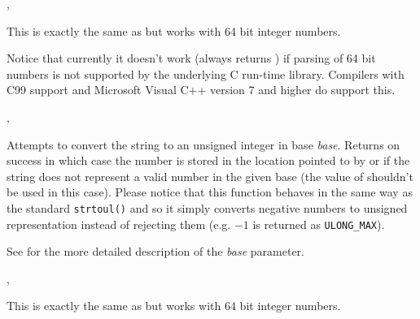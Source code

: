 
,\\


\label{wxstringtolonglong}


This is exactly the same as  but works with 64
bit integer numbers.

Notice that currently it doesn't work (always returns \false) if parsing of 64
bit numbers is not supported by the underlying C run-time library. Compilers
with C99 support and Microsoft Visual C++ version 7 and higher do support this.


,\\


\label{wxstringtoulong}


Attempts to convert the string to an unsigned integer in base {\it base}.
Returns \true on success in which case the number is stored in the
location pointed to by  or \false if the string does not
represent a valid number in the given base (the value of  shouldn't
be used in this case). Please notice that this function
behaves in the same way as the standard \texttt{strtoul()} and so it simply
converts negative numbers to unsigned representation instead of rejecting them
(e.g. $-1$ is returned as \texttt{ULONG\_MAX}).

See  for the more detailed
description of the {\it base} parameter.


,\\


\label{wxstringtoulonglong}


This is exactly the same as  but works with 64
bit integer numbers.

